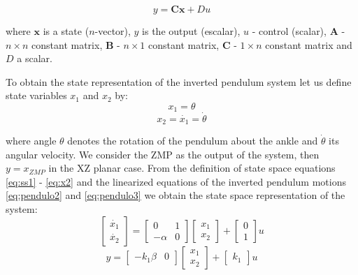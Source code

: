 \begin{equation}
y = \mathbf{C}\textbf{x} + Du
\label{eq:ss2}
\end{equation}

where $\mathbf{x}$ is a state ($n$-vector), $y$ is the output (escalar), $u$ - control (scalar), $\mathbf{A}$ - $n \times n$ constant  matrix, $\mathbf{B}$ - $n \times 1$ constant matrix, $\mathbf{C}$ - $1 \times n$ constant matrix and $D$ a scalar.

To obtain the state representation of the inverted pendulum system let us define state variables $x_1$ and $x_2$ by:
\begin{equation}
x_1 = \theta
\label{eq:x1}
\end{equation}
\begin{equation}
x_2 = \dot{x_1} = \dot{\theta}
\label{eq:x2}
\end{equation} 

where angle $\theta$ denotes the rotation of the pendulum about the ankle and $\dot{\theta}$ its angular velocity. We consider the ZMP as the output of the system, then $y = x_{ZMP}$ in the XZ planar case. From the definition of state space equations \eqref{eq:ss1} - \eqref{eq:x2} and the linearized equations of the inverted pendulum motions \eqref{eq:pendulo2} and \eqref{eq:pendulo3} we obtain the state space representation of the system:
\begin{equation}
\begin{bmatrix}
\dot{x_1} \\
\dot{x_2}
\end{bmatrix} 
= 
\begin{bmatrix}
0 & 1 \\
-\alpha & 0
\end{bmatrix}
\begin{bmatrix}
x_1 \\
x_2
\end{bmatrix}
+
\begin{bmatrix}
0 \\
1
\end{bmatrix}
u
\label{eq:state_space}
\end{equation}
\begin{equation}
y = \begin{bmatrix}
-k_1\beta & 0 
\end{bmatrix}
\begin{bmatrix}
x_1 \\
x_2
\end{bmatrix}
+ \begin{bmatrix}
k_1
\end{bmatrix}
u
\label{eq:state_space_out}
\end{equation}

